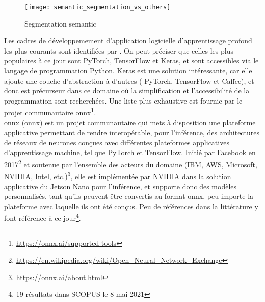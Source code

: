 \begin{figure}[H]
   \centering
   \texttt{[image: semantic\_segmentation\_vs\_others]}
   \caption[Segmentation semantic]{Segmentation semantic\parencite[p.~1]{wu_recent_2019}}
   \label{fig:semantic_segmentation_vs_others}
\end{figure}
\noindent Les cadres de développemement d'application logicielle d'apprentissage profond les plus courants sont identifiées par \parencite{cornioley_integration_2018}. On peut préciser que celles les plus populaires à ce jour sont PyTorch, TensorFlow et Keras, et sont accessibles via le langage de programmation Python. Keras est une solution intéressante, car elle ajoute une couche d'abstraction à d'autres ( PyTorch, TensorFlow et Caffee), et donc est précurseur dans ce domaine où la simplification et l'accessibilité de la programmation sont recherchées. Une liste plus exhaustive est fournie par le projet communautaire \acrshort{onnx}\footnote{\url{https://onnx.ai/supported-tools}}.
\vspace{\baselineskip}
\\
\noindent \acrshort{onnx} (\acrlong{onnx}) est un projet communautaire qui mets à disposition une plateforme applicative permettant de rendre interopérable, pour l'inférence, des architectures de réseaux de neurones conçues avec différentes plateformes applicatives d'apprentissage machine, tel que PyTorch et TensorFlow. Initié par Facebook en 2017\footnote{\url{https://en.wikipedia.org/wiki/Open_Neural_Network_Exchange}} et soutenue par l'ensemble des acteurs du domaine (IBM, AWS, Microsoft, NVIDIA, Intel, etc.)\footnote{\url{https://onnx.ai/about.html}}, elle est implémentée par NVIDIA dans la solution applicative du Jetson Nano pour l'inférence, et supporte donc des modèles personnalisés, tant qu'ils peuvent être convertis au format \acrshort{onnx}, peu importe la plateforme avec laquelle ils ont été conçus. Peu de références dans la littérature y font référence à ce jour\footnote{19 résultats dans SCOPUS le 8 mai 2021}.